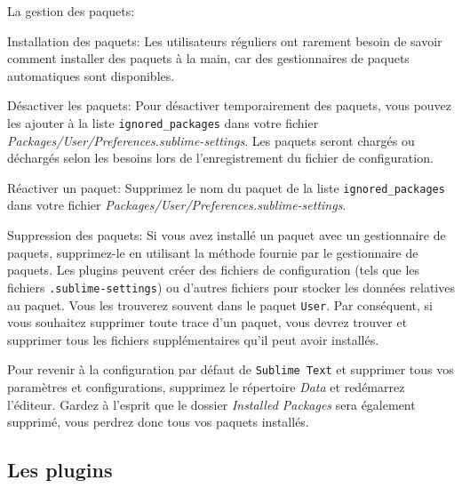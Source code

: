 \documentclass[french,a4paper]{article}
\begin{document}
La gestion des paquets:
\begin{description}
    \item{Installation des paquets}: Les utilisateurs réguliers ont rarement besoin de savoir comment installer des paquets à la main, car des gestionnaires de paquets automatiques sont disponibles.
    \item{Désactiver les paquets}: Pour désactiver temporairement des paquets, vous pouvez les ajouter à la liste \texttt{ignored\_packages} dans votre fichier \textit{Packages/User/Preferences.sublime-settings}. Les paquets seront chargés ou déchargés selon les besoins lors de l'enregistrement du fichier de configuration.
    \item{Réactiver un paquet}: Supprimez le nom du paquet de la liste \texttt{ignored\_packages} dans votre fichier \textit{Packages/User/Preferences.sublime-settings}.
    \item{Suppression des paquets}: Si vous avez installé un paquet avec un gestionnaire de paquets, supprimez-le en utilisant la méthode fournie par le gestionnaire de paquets. Les plugins peuvent créer des fichiers de configuration (tels que les fichiers \texttt{.sublime-settings}) ou d'autres fichiers pour stocker les données relatives au paquet. Vous les trouverez souvent dans le paquet \texttt{User}. Par conséquent, si vous souhaitez supprimer toute trace d'un paquet, vous devrez trouver et supprimer tous les fichiers supplémentaires qu'il peut avoir installés.
\end{description}
\medskip

Pour revenir à la configuration par défaut de \texttt{Sublime Text} et supprimer
tous vos paramètres et configurations, supprimez le répertoire \textit{Data} et 
redémarrez l'éditeur. Gardez à l'esprit que le dossier 
\textit{Installed Packages} sera également supprimé, vous perdrez donc tous vos 
paquets installés.
\bigskip

\subsection*{Les plugins}
\end{document}

